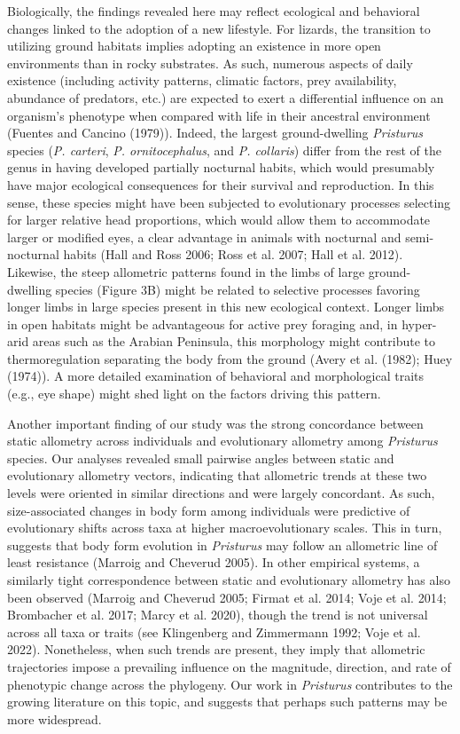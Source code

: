 \documentclass[
  11pt,
]{article}
\begin{document}
Biologically, the findings revealed here may reflect ecological and
behavioral changes linked to the adoption of a new lifestyle. For
lizards, the transition to utilizing ground habitats implies adopting an
existence in more open environments than in rocky substrates. As such,
numerous aspects of daily existence (including activity patterns,
climatic factors, prey availability, abundance of predators, etc.) are
expected to exert a differential influence on an organism's phenotype
when compared with life in their ancestral environment (Fuentes and
Cancino (1979)). Indeed, the largest ground-dwelling \emph{Pristurus}
species (\emph{P. carteri}, \emph{P. ornitocephalus}, and \emph{P.
collaris}) differ from the rest of the genus in having developed
partially nocturnal habits, which would presumably have major ecological
consequences for their survival and reproduction. In this sense, these
species might have been subjected to evolutionary processes selecting
for larger relative head proportions, which would allow them to
accommodate larger or modified eyes, a clear advantage in animals with
nocturnal and semi-nocturnal habits (Hall and Ross 2006; Ross et al.
2007; Hall et al. 2012). Likewise, the steep allometric patterns found
in the limbs of large ground-dwelling species (Figure 3B) might be
related to selective processes favoring longer limbs in large species
present in this new ecological context. Longer limbs in open habitats
might be advantageous for active prey foraging and, in hyper-arid areas
such as the Arabian Peninsula, this morphology might contribute to
thermoregulation separating the body from the ground (Avery et al.
(1982); Huey (1974)). A more detailed examination of behavioral and
morphological traits (e.g., eye shape) might shed light on the factors
driving this pattern. \hfill\break

Another important finding of our study was the strong concordance
between static allometry across individuals and evolutionary allometry
among \emph{Pristurus} species. Our analyses revealed small pairwise
angles between static and evolutionary allometry vectors, indicating
that allometric trends at these two levels were oriented in similar
directions and were largely concordant. As such, size-associated changes
in body form among individuals were predictive of evolutionary shifts
across taxa at higher macroevolutionary scales. This in turn, suggests
that body form evolution in \emph{Pristurus} may follow an allometric
line of least resistance (Marroig and Cheverud 2005). In other empirical
systems, a similarly tight correspondence between static and
evolutionary allometry has also been observed (Marroig and Cheverud
2005; Firmat et al. 2014; Voje et al. 2014; Brombacher et al. 2017;
Marcy et al. 2020), though the trend is not universal across all taxa or
traits (see Klingenberg and Zimmermann 1992; Voje et al. 2022).
Nonetheless, when such trends are present, they imply that allometric
trajectories impose a prevailing influence on the magnitude, direction,
and rate of phenotypic change across the phylogeny. Our work in
\emph{Pristurus} contributes to the growing literature on this topic,
and suggests that perhaps such patterns may be more
widespread.\hfill\break
\end{document}
